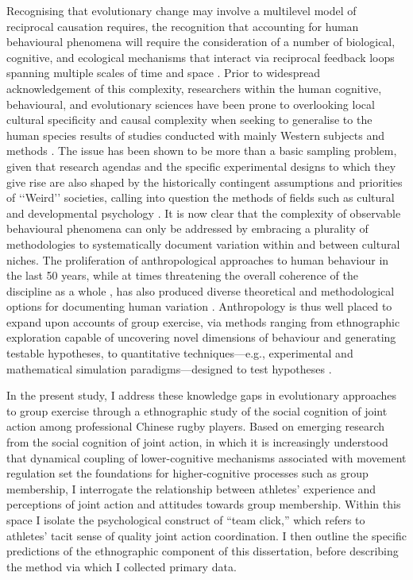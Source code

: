 Recognising that evolutionary change may involve a multilevel model of reciprocal causation requires, the recognition that accounting for human behavioural phenomena will require the consideration of a number of biological, cognitive, and ecological mechanisms that interact via reciprocal feedback loops spanning multiple scales of time and space \citep{Fuentes2015}.  Prior to widespread acknowledgement of this complexity, researchers within the human cognitive, behavioural, and evolutionary sciences have been prone to overlooking local cultural specificity and causal complexity when seeking to generalise to the human species results of studies conducted with mainly Western subjects and methods \citep{Henrich2010d}.  The issue has been shown to be more than a basic sampling problem, given that research agendas and the specific experimental designs to which they give rise are also shaped by the historically contingent assumptions and priorities of ‘‘Weird’’ societies, calling into question the methods of fields such as cultural and developmental psychology \citep{Whitehouse2012}.  It is now clear that the complexity of observable behavioural phenomena can only be addressed by embracing a plurality of methodologies to systematically document variation within and between cultural niches.  The proliferation of anthropological approaches to human behaviour in the last 50 years, while at times threatening the overall coherence of the discipline as a whole \citep{Beller2012}, has also produced diverse theoretical and methodological options for documenting human variation \citep{Fuentes2016a}.
Anthropology is thus well placed to expand upon accounts of group exercise, via methods ranging from ethnographic exploration capable of uncovering novel dimensions of behaviour and generating testable hypotheses, to quantitative techniques---e.g., experimental and mathematical simulation paradigms---designed to test hypotheses \citep{Epstein2006,Fuentes2016}.

In the present study, I address these knowledge gaps in evolutionary approaches to group exercise through a ethnographic study of the social cognition of joint action among professional Chinese rugby players.  Based on emerging research from the social cognition of joint action, in which it is increasingly understood that dynamical coupling of lower-cognitive mechanisms associated with movement regulation set the foundations for higher-cognitive processes such as group membership, I interrogate the relationship between athletes' experience and perceptions of joint action and attitudes towards group membership.  Within this space I isolate the psychological construct of ``team click,'' which refers to athletes' tacit sense of quality joint action coordination.   I then outline the specific predictions of the ethnographic component of this dissertation, before describing the method via which I collected primary data.


















